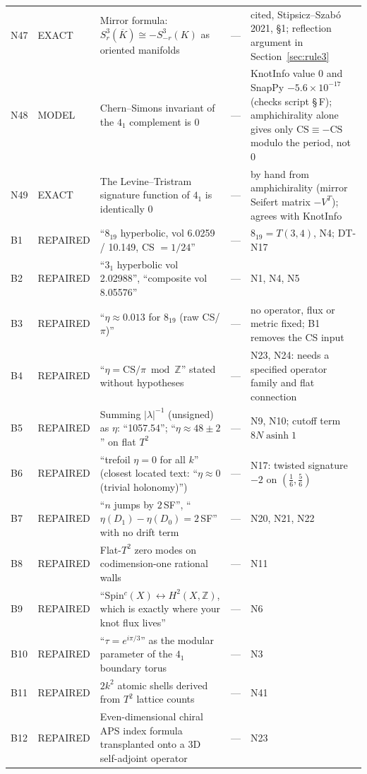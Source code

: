 \documentclass[11pt]{article}
\theoremstyle{definition}
\begin{document}
{\begin{longtable}{@{}L{0.05\textwidth}L{0.12\textwidth}L{0.26\textwidth}L{0.27\textwidth}L{0.17\textwidth}@{}}
N47 & EXACT & Mirror formula: $S^3_r(\overline K)\cong-S^3_{-r}(K)$ as oriented manifolds & --- & cited, Stipsicz--Szab\'o 2021, \S1; reflection argument in Section~\ref{sec:rule3}\\
N48 & MODEL & Chern--Simons invariant of the $4_1$ complement is $0$ & --- & KnotInfo value $0$ and SnapPy $-5.6\times10^{-17}$ (checks script \S\,F); amphichirality alone gives only $\mathrm{CS}\equiv-\mathrm{CS}$ modulo the period, not $0$\\
N49 & EXACT & The Levine--Tristram signature function of $4_1$ is identically $0$ & --- & by hand from amphichirality (mirror Seifert matrix $-V^{T}$); agrees with KnotInfo\\
B1 & REPAIRED & ``$8_{19}$ hyperbolic, vol 6.0259 / 10.149, CS $=1/24$'' & --- & $8_{19}=T(3,4)$, N4; DT-N17\\
B2 & REPAIRED & ``$3_1$ hyperbolic vol 2.02988'', ``composite vol 8.05576'' & --- & N1, N4, N5\\
B3 & REPAIRED & ``$\eta\approx0.013$ for $8_{19}$ (raw CS/$\pi$)'' & --- & no operator, flux or metric fixed; B1 removes the CS input\\
B4 & REPAIRED & ``$\eta=\mathrm{CS}/\pi\bmod\mathbb Z$'' stated without hypotheses & --- & N23, N24: needs a specified operator family and flat connection\\
B5 & REPAIRED & Summing $|\lambda|^{-1}$ (unsigned) as $\eta$: ``1057.54''; ``$\eta\approx48\pm2$'' on flat $T^2$ & --- & N9, N10; cutoff term $8N\operatorname{asinh}1$\\
B6 & REPAIRED & ``trefoil $\eta=0$ for all $k$'' (closest located text: ``$\eta\approx0$ (trivial holonomy)'') & --- & N17: twisted signature $-2$ on $(\tfrac16,\tfrac56)$\\
B7 & REPAIRED & ``$n$ jumps by $2\,$SF'', ``$\eta(D_1)-\eta(D_0)=2\,$SF'' with no drift term & --- & N20, N21, N22\\
B8 & REPAIRED & Flat-$T^2$ zero modes on codimension-one rational walls & --- & N11\\
B9 & REPAIRED & ``Spin$^c(X)\leftrightarrow H^2(X,\mathbb Z)$, which is exactly where your knot flux lives'' & --- & N6\\
B10 & REPAIRED & ``$\tau=e^{i\pi/3}$'' as the modular parameter of the $4_1$ boundary torus & --- & N3\\
B11 & REPAIRED & $2k^2$ atomic shells derived from $T^2$ lattice counts & --- & N41\\
B12 & REPAIRED & Even-dimensional chiral APS index formula transplanted onto a 3D self-adjoint operator & --- & N23\\
\bottomrule\end{longtable}}
\end{document}

